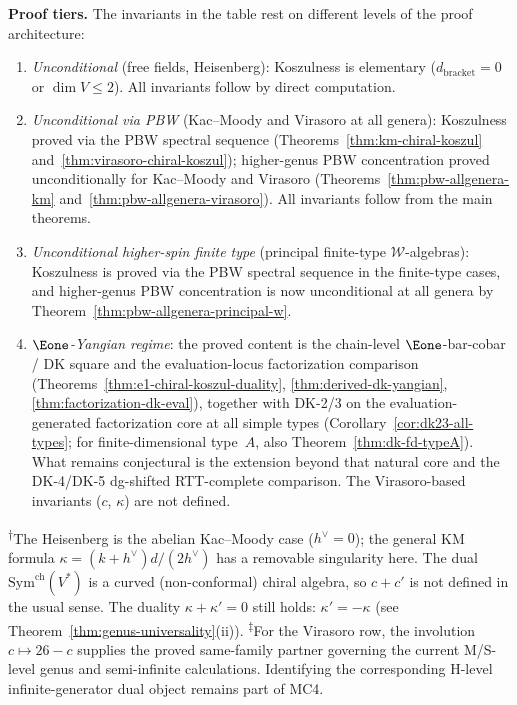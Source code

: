 \smallskip
\noindent\textbf{Proof tiers.}  The invariants in the table rest on
different levels of the proof architecture:

\begin{enumerate}
\item[\textbf{T1.}] \emph{Unconditional} (free fields, Heisenberg):
  Koszulness is elementary ($d_{\mathrm{bracket}} = 0$ or $\dim V \le 2$).
  All invariants follow by direct computation.
\item[\textbf{T1$\frac{1}{2}$.}] \emph{Unconditional via PBW}
  (Kac--Moody and Virasoro at all genera):
  Koszulness proved via the PBW spectral sequence
  (Theorems~\ref{thm:km-chiral-koszul}
  and~\ref{thm:virasoro-chiral-koszul}); higher-genus PBW concentration
  proved unconditionally for Kac--Moody and Virasoro
  (Theorems~\ref{thm:pbw-allgenera-km}
  and~\ref{thm:pbw-allgenera-virasoro}).
  All invariants follow from the main theorems.
\item[\textbf{T2.}] \emph{Unconditional higher-spin finite type}
  (principal finite-type $\mathcal{W}$-algebras):
  Koszulness is proved via the PBW spectral sequence in the finite-type
  cases, and higher-genus PBW concentration is now unconditional at all
  genera by Theorem~\ref{thm:pbw-allgenera-principal-w}.
\item[\textbf{DK-core.}] \emph{$\Eone$-Yangian regime}:
  the proved content is the chain-level $\Eone$-bar-cobar / DK square
  and the evaluation-locus factorization comparison
  \textup{(}Theorems~\ref{thm:e1-chiral-koszul-duality},
  \ref{thm:derived-dk-yangian}, \ref{thm:factorization-dk-eval}\textup{)},
  together with DK-2/3 on the evaluation-generated factorization core
  at all simple types
  \textup{(}Corollary~\ref{cor:dk23-all-types}; for finite-dimensional
  type~$A$, also Theorem~\ref{thm:dk-fd-typeA}\textup{)}.
  What remains conjectural is the extension beyond that natural core
  and the DK-4/DK-5 dg-shifted RTT-complete comparison.
  The Virasoro-based invariants ($c$, $\kappa$) are not defined.
\end{enumerate}

\smallskip
\noindent\textsuperscript{$\dagger$}The Heisenberg is the abelian Kac--Moody case ($h^\vee = 0$);
the general KM formula $\kappa = (k+h^\vee)d/(2h^\vee)$ has a removable singularity here.
The dual $\mathrm{Sym}^{\mathrm{ch}}(V^*)$ is a curved (non-conformal) chiral algebra,
so $c + c'$ is not defined in the usual sense.
The duality $\kappa + \kappa' = 0$ still holds: $\kappa' = -\kappa$
(see Theorem~\ref{thm:genus-universality}(ii)).
\textsuperscript{$\ddagger$}For the Virasoro row, the involution
$c \mapsto 26-c$ supplies the proved same-family partner governing the
current M/S-level genus and semi-infinite calculations.  Identifying the
corresponding H-level infinite-generator dual object remains part of
MC4.

